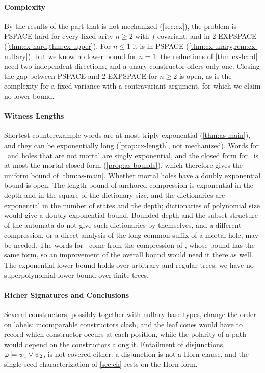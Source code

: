 \paragraph{Complexity}
By the results of the part that is not mechanized (\cref{sec:cx}), the problem
is PSPACE-hard for every fixed arity $n\ge2$ with $f$ covariant, and in
2-EXPSPACE (\cref{thm:cx-hard,thm:cx-upper}). For $n\le1$ it is in PSPACE
(\cref{thm:cx-unary,rem:cx-nullary}), but we know no lower bound for
$n=1$: the reductions of \cref{thm:cx-hard} need two independent directions,
and a unary constructor offers only one. Closing the gap between PSPACE and
2-EXPSPACE for $n\ge2$ is open, as is the complexity for a fixed variance with
a contravariant argument, for which we claim no lower bound.

\paragraph{Witness Lengths}
Shortest counterexample words are at most triply exponential
(\cref{thm:as-main}), and they can be exponentially long
(\cref{prop:cx-length}, not mechanized). Words for \CondI\ and holes that are not mortal are
singly exponential, and the closed form for \CondU\ is at most the mortal
closed form (\cref{prop:as-bounds}), which therefore gives the uniform bound
of \cref{thm:as-main}. Whether mortal holes have a doubly exponential bound is open.
The length bound of anchored compression is exponential in the depth and in
the square of the dictionary size, and the dictionaries are exponential in
the number of states and the depth; dictionaries of polynomial size would give
a doubly exponential bound. Bounded depth and the subset structure of the
automata do not give such dictionaries by themselves, and a different
compression, or a direct analysis of the long common suffix of a mortal hole,
may be needed. The words for \CondU\ come from the compression of \citet{Zhao26},
whose bound has the same form, so an improvement of the overall bound would
need it there as well. The exponential lower bound holds over arbitrary and
regular trees; we have no superpolynomial lower bound over finite trees.

\paragraph{Richer Signatures and Conclusions}
Several constructors, possibly together with nullary base types, change the
order on labels: incomparable constructors clash, and the leaf cones would have
to record which constructor occurs at each position, while the polarity of a
path would depend on the constructors along it. Entailment of disjunctions,
$\varphi\models\psi_1\vee\psi_2$, is not covered either: a disjunction is not
a Horn clause, and the single-seed characterization of \cref{sec:ch} rests on
the Horn form.

